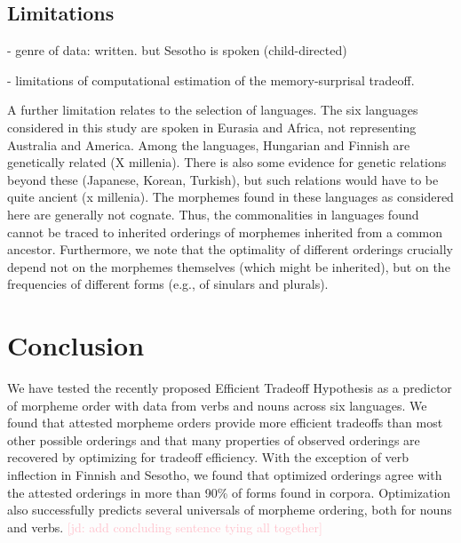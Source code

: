 \documentclass[11pt,letterpaper]{article}
\newcommand{\jd}[1]{\textcolor{Pink}{[jd: #1]}}
\begin{document}
\subsection{Limitations}

- genre of data: written. but Sesotho is spoken (child-directed)

- limitations of computational estimation of the memory-surprisal tradeoff. %


A further limitation relates to the selection of languages.
The six languages considered in this study are spoken in Eurasia and Africa, not representing Australia and America.
Among the languages, Hungarian and Finnish are genetically related (X millenia).
There is also some evidence for genetic relations beyond these (Japanese, Korean, Turkish), but such relations would have to be quite ancient (x millenia).
The morphemes found in these languages as considered here are generally not cognate.
Thus, the commonalities in languages found cannot be traced to inherited orderings of morphemes inherited from a common ancestor.
Furthermore, we note that the optimality of different orderings crucially depend not on the morphemes themselves (which might be inherited), but on the frequencies of different forms (e.g., of sinulars and plurals).



\section{Conclusion}

We have tested the recently proposed Efficient Tradeoff Hypothesis as a predictor of morpheme order with data from verbs and nouns across six languages.
We found that attested morpheme orders provide more efficient tradeoffs than most other possible orderings and that many properties of observed orderings are recovered by optimizing for tradeoff efficiency.
With the exception of verb inflection in Finnish and Sesotho, we found that optimized orderings agree with the attested orderings in more than 90\% of forms found in corpora.
Optimization also successfully predicts several universals of morpheme ordering, both for nouns and verbs. \jd{add concluding sentence tying all together}


\printbibliography
\end{document}
